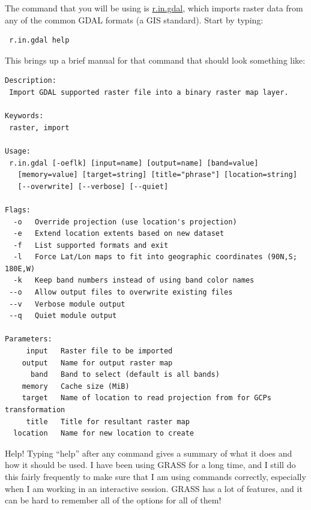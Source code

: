 \documentclass{book}
\begin{document}
The command that you will be using is \url{r.in.gdal}, which imports raster data from any of the common GDAL formats (a GIS standard). Start by typing:
\begin{lstlisting}
 r.in.gdal help
\end{lstlisting}
This brings up a brief manual for that command that should look something like:
\begin{lstlisting}
Description:
 Import GDAL supported raster file into a binary raster map layer.

Keywords:
 raster, import

Usage:
 r.in.gdal [-oeflk] [input=name] [output=name] [band=value]
   [memory=value] [target=string] [title="phrase"] [location=string]
   [--overwrite] [--verbose] [--quiet]

Flags:
  -o   Override projection (use location's projection)
  -e   Extend location extents based on new dataset
  -f   List supported formats and exit
  -l   Force Lat/Lon maps to fit into geographic coordinates (90N,S; 180E,W)
  -k   Keep band numbers instead of using band color names
 --o   Allow output files to overwrite existing files
 --v   Verbose module output
 --q   Quiet module output

Parameters:
     input   Raster file to be imported
    output   Name for output raster map
      band   Band to select (default is all bands)
    memory   Cache size (MiB)
    target   Name of location to read projection from for GCPs transformation
     title   Title for resultant raster map
  location   Name for new location to create
\end{lstlisting}

\begin{boxx}[!ht]
\begin{bclogo}[arrondi = 0.1, logo = \bcrosevents]{Help!}
Typing ``help'' after any command gives a summary of what it does and how it should be used. I have been using GRASS for a long time, and I still do this fairly frequently to make sure that I am using commands correctly, especially when I am working in an interactive session. GRASS has a lot of features, and it can be hard to remember all of the options for all of them!
\end{bclogo}
\caption{Help!}
\end{boxx}
\end{document}
